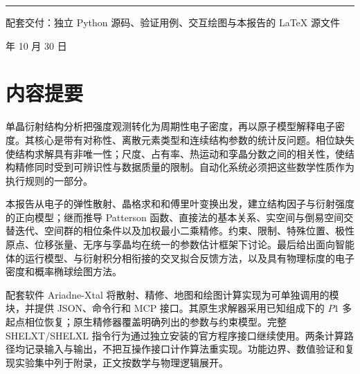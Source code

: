 \documentclass[11pt,a4paper,oneside,openany]{book}
\begin{document}
\setlength{\abovedisplayskip}{7pt plus 2pt minus 2pt}
\setlength{\belowdisplayskip}{7pt plus 2pt minus 2pt}
\setlength{\abovedisplayshortskip}{4pt plus 2pt}
\setlength{\belowdisplayshortskip}{4pt plus 2pt minus 2pt}
\frontmatter
\begin{titlepage}
\vspace*{18mm}
\par
\vspace{16mm}
\par
\vspace{12mm}
\par
\vspace{18mm}
\noindent\rule{\textwidth}{0.7pt}\par
\vspace{5mm}
\par
\vfill
\noindent 配套交付：独立 Python 源码、验证用例、交互绘图与本报告的 LaTeX 源文件\par
\vspace{8mm}
 年 10 月 30 日\par
\end{titlepage}
\chapter*{内容提要}
单晶衍射结构分析把强度观测转化为周期性电子密度，再以原子模型解释电子密度。其核心是带有对称性、离散元素类型和连续结构参数的统计反问题。相位缺失使结构求解具有非唯一性；尺度、占有率、热运动和孪晶分数之间的相关性，使结构精修同时受到可辨识性与数据质量的限制。自动化系统必须把这些数学性质作为执行规则的一部分。

本报告从电子的弹性散射、晶格求和和傅里叶变换出发，建立结构因子与衍射强度的正向模型；继而推导 Patterson 函数、直接法的基本关系、实空间与倒易空间交替迭代、空间群的相位条件以及加权最小二乘精修。约束、限制、特殊位置、极性原点、位移张量、无序与孪晶均在统一的参数估计框架下讨论。最后给出面向智能体的运行模型、与衍射积分相衔接的交叉拟合反馈方法，以及具有物理标度的电子密度和概率椭球绘图方法。

配套软件 Ariadne-Xtal 将散射、精修、地图和绘图计算实现为可单独调用的模块，并提供 JSON、命令行和 MCP 接口。其原生求解器采用已知组成下的 $P1$ 多起点相位恢复；原生精修器覆盖明确列出的参数与约束模型。完整 SHELXT/SHELXL 指令行为通过独立安装的官方程序接口继续使用。两条计算路径均记录输入与输出，不把互操作接口计作算法重实现。功能边界、数值验证和复现实验集中列于附录，正文按数学与物理逻辑展开。
\end{document}
